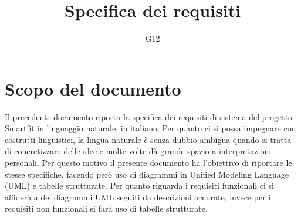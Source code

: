 \documentclass{article}
\author{G12}
\title{Specifica dei requisiti}
\date{}
\begin{document}
\maketitle
\tableofcontents
\clearpage
\section{Scopo del documento}
Il precedente documento riporta la specifica dei requisiti di sistema del progetto Smartfit in linguaggio naturale, in italiano. Per quanto ci si
possa impegnare con costrutti linguistici, la lingua naturale è senza dubbio ambigua quando si tratta di concretizzare delle idee e molte volte dà
grande spazio a interpretazioni personali. Per questo motivo il presente documento ha l'obiettivo di riportare le stesse specifiche, facendo però
uso di diagrammi in Unified Modeling Language (UML) e tabelle strutturate. Per quanto riguarda i requisiti funzionali ci si affiderà a dei
diagrammi UML seguiti da descrizioni accurate, invece per i requisiti non funzionali si farà uso di tabelle strutturate.
\end{document}
